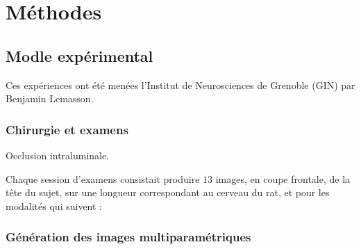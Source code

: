\section{M\'ethodes}

\makeatletter
\renewcommand{\thefigure}{\ifnum \c@section>\z@ \thesection.\fi
 \@arabic\c@figure}
\makeatother
\begin{comment}
Remarque : pour renuméroter les sous-figures de la même manière
           (avec le package 'subfigure'), il suffit de rajouter
	   la ligne \let\p@subfigure\thefigure dans le préambule.
\end{comment}

\subsection{Modle exp\'erimental}

Ces exp\'eriences ont \'et\'e men\'ees  l'Institut de Neurosciences de Grenoble (GIN) par Benjamin Lemasson.

\cite{Lem_PHD_10}

\subsubsection{Chirurgie et examens}%

Occlusion intraluminale.


Chaque session d'examens consistait  produire $13$ images, en coupe frontale, de la t\^ete du sujet, %
sur une longueur correspondant au cerveau du rat, et pour les modalit\'es qui suivent :

\subsubsection{G\'en\'eration des images multiparam\'etriques}%





